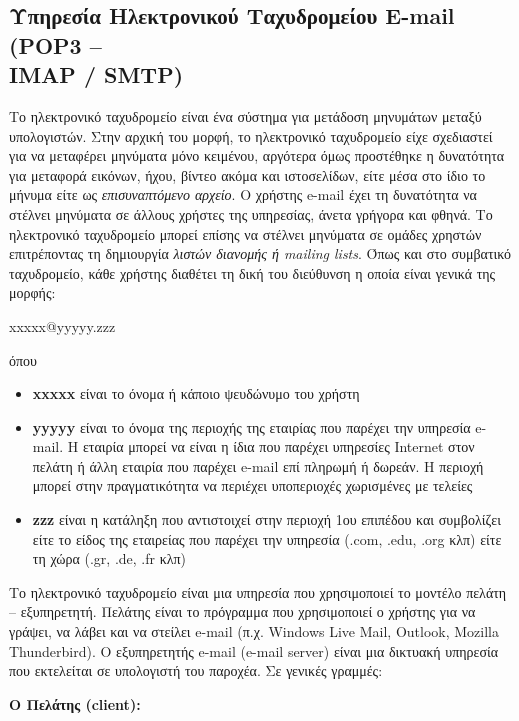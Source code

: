 %
%
\subsection{Υπηρεσία Ηλεκτρονικού Ταχυδρομείου E-mail (POP3 --\\ IMAP / SMTP)}

Το ηλεκτρονικό ταχυδρομείο είναι ένα σύστημα για μετάδοση μηνυμάτων μεταξύ υπολογιστών. Στην αρχική του μορφή, το ηλεκτρονικό ταχυδρομείο είχε σχεδιαστεί για να μεταφέρει μηνύματα μόνο κειμένου, αργότερα όμως προστέθηκε η δυνατότητα για μεταφορά εικόνων, ήχου, βίντεο ακόμα και ιστοσελίδων, είτε μέσα στο ίδιο το μήνυμα είτε ως \emph{επισυναπτόμενο αρχείο}. Ο χρήστης e-mail έχει τη δυνατότητα να στέλνει μηνύματα σε άλλους χρήστες της υπηρεσίας, άνετα γρήγορα και φθηνά. Το ηλεκτρονικό ταχυδρομείο μπορεί επίσης να στέλνει μηνύματα σε ομάδες χρηστών επιτρέποντας τη δημιουργία \emph{λιστών διανομής ή mailing lists}. Όπως και στο συμβατικό ταχυδρομείο, κάθε χρήστης διαθέτει τη δική του διεύθυνση η οποία είναι γενικά της μορφής:

\begin{center}
xxxxx@yyyyy.zzz
\end{center}

όπου

\begin{itemize}
\item \textbf{xxxxx} είναι το όνομα ή κάποιο ψευδώνυμο του χρήστη
\item \textbf{yyyyy} είναι το όνομα της περιοχής της εταιρίας που παρέχει την υπηρεσία e-mail. Η εταιρία μπορεί να είναι η ίδια που παρέχει υπηρεσίες Internet στον πελάτη ή άλλη εταιρία που παρέχει e-mail επί πληρωμή ή δωρεάν. Η περιοχή μπορεί στην πραγματικότητα να περιέχει υποπεριοχές χωρισμένες με τελείες
\item \textbf{zzz} είναι η κατάληξη που αντιστοιχεί στην περιοχή 1ου επιπέδου και συμβολίζει είτε το είδος της εταιρείας που παρέχει την υπηρεσία (.com, .edu, .org κλπ) είτε τη χώρα (.gr, .de, .fr κλπ)
\end{itemize}

Το ηλεκτρονικό ταχυδρομείο είναι μια υπηρεσία που χρησιμοποιεί το μοντέλο πελάτη -- εξυπηρετητή. Πελάτης είναι το πρόγραμμα που χρησιμοποιεί ο χρήστης για να γράψει, να λάβει και να στείλει e-mail (π.χ. Windows Live Mail, Outlook, Mozilla Thunderbird). Ο εξυπηρετητής e-mail (e-mail server) είναι μια δικτυακή υπηρεσία που εκτελείται σε υπολογιστή του παροχέα. Σε γενικές γραμμές:

\textbf{Ο Πελάτης (client):}

